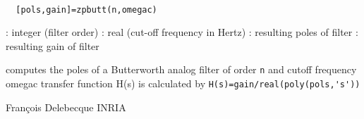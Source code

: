 
\begin{mandesc}
   \\ %
\end{mandesc}
\begin{calling_sequence}
\begin{verbatim}
  [pols,gain]=zpbutt(n,omegac)  
\end{verbatim}
\end{calling_sequence}
\begin{parameters}
  \begin{varlist}
    : integer (filter order)
    : real (cut-off frequency in Hertz)
    : resulting poles of filter
    : resulting gain of filter
  \end{varlist}
\end{parameters}
\begin{mandescription}
  computes the poles of a Butterworth analog
  filter of order \verb!n! and cutoff frequency omegac
  transfer function H(s) is calculated by \verb!H(s)=gain/real(poly(pols,'s'))!
\end{mandescription}
\begin{authors}
  Fran\c{c}ois Delebecque INRIA
\end{authors}
